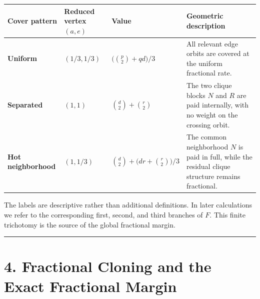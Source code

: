 \documentclass[english,11pt,a4paper]{article}
\newcounter{none}
\begin{document}
{\def\LTcaptype{none} %
\begin{longtable}[]{@{}
  >{\raggedright\arraybackslash}p{}
  >{\raggedleft\arraybackslash}p{}
  >{\raggedleft\arraybackslash}p{}
  >{\raggedright\arraybackslash}p{}@{}}
\toprule\noalign{}
\begin{minipage}[b]{\linewidth}\raggedright
Cover pattern
\end{minipage} & \begin{minipage}[b]{\linewidth}\raggedleft
Reduced vertex \((a,e)\)
\end{minipage} & \begin{minipage}[b]{\linewidth}\raggedleft
Value
\end{minipage} & \begin{minipage}[b]{\linewidth}\raggedright
Geometric description
\end{minipage} \\
\midrule\noalign{}
\endhead
\bottomrule\noalign{}
\endlastfoot
\textbf{Uniform} & \((1/3,1/3)\) & \(\bigl(\binom p2+qd\bigr)/3\) & All
relevant edge orbits are covered at the uniform fractional rate. \\
\textbf{Separated} & \((1,1)\) & \(\binom d2+\binom r2\) & The two
clique blocks \(N\) and \(R\) are paid internally, with no weight on the
crossing orbit. \\
\textbf{Hot neighborhood} & \((1,1/3)\) &
\(\binom d2+\bigl(dr+\binom r2\bigr)/3\) & The common neighborhood \(N\)
is paid in full, while the residual clique structure remains
fractional. \\
\end{longtable}
}

The labels are descriptive rather than additional definitions. In later
calculations we refer to the corresponding first, second, and third
branches of \(F\). This finite trichotomy is the source of the global
fractional margin.

\begin{center}\rule{0.5\linewidth}{0.5pt}\end{center}

\section{4. Fractional Cloning and the Exact Fractional
Margin}\label{fractional-cloning-and-the-exact-fractional-margin}
\end{document}
